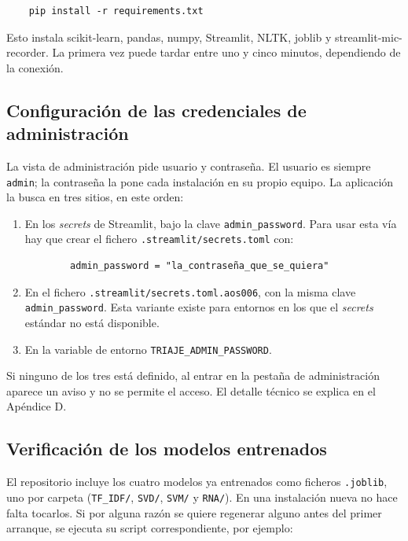 \begin{verbatim}
	pip install -r requirements.txt
\end{verbatim}

Esto instala scikit-learn, pandas, numpy, Streamlit, NLTK, joblib y streamlit-mic-recorder. La primera vez puede tardar entre uno y cinco minutos, dependiendo de la conexión.

\subsection*{Configuración de las credenciales de administración}

La vista de administración pide usuario y contraseña. El usuario es siempre \texttt{admin}; la contraseña la pone cada instalación en su propio equipo. La aplicación la busca en tres sitios, en este orden:

\begin{enumerate}
	\item En los \textit{secrets} de Streamlit, bajo la clave \texttt{admin\_password}. Para usar esta vía hay que crear el fichero \texttt{.streamlit/secrets.toml} con:
	\begin{verbatim}
		admin_password = "la_contraseña_que_se_quiera"
	\end{verbatim}
	\item En el fichero \texttt{.streamlit/secrets.toml.aos006}, con la misma clave \texttt{admin\_password}. Esta variante existe para entornos en los que el \textit{secrets} estándar no está disponible.
	\item En la variable de entorno \texttt{TRIAJE\_ADMIN\_PASSWORD}.
\end{enumerate}

Si ninguno de los tres está definido, al entrar en la pestaña de administración aparece un aviso y no se permite el acceso. El detalle técnico se explica en el Apéndice D.

\subsection*{Verificación de los modelos entrenados}

El repositorio incluye los cuatro modelos ya entrenados como ficheros \texttt{.joblib}, uno por carpeta (\texttt{TF\_IDF/}, \texttt{SVD/}, \texttt{SVM/} y \texttt{RNA/}). En una instalación nueva no hace falta tocarlos. Si por alguna razón se quiere regenerar alguno antes del primer arranque, se ejecuta su script correspondiente, por ejemplo:

